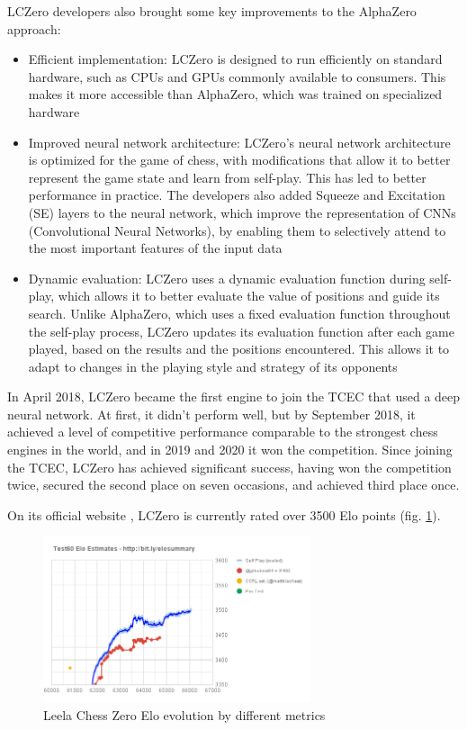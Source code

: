 LCZero developers also brought some key improvements to the AlphaZero approach:
\begin{itemize}
    \item Efficient implementation: LCZero is designed to run efficiently on standard hardware, such as CPUs and GPUs commonly available to consumers. This makes it more accessible than AlphaZero, which was trained on specialized hardware
    \item Improved neural network architecture: LCZero's neural network architecture is optimized for the game of chess, with modifications that allow it to better represent the game state and learn from self-play. This has led to better performance in practice. The developers also added Squeeze and Excitation (SE) layers to the neural network, which improve the representation of CNNs (Convolutional Neural Networks), by enabling them to selectively attend to the most important features of the input data
    \item Dynamic evaluation: LCZero uses a dynamic evaluation function during self-play, which allows it to better evaluate the value of positions and guide its search. Unlike AlphaZero, which uses a fixed evaluation function throughout the self-play process, LCZero updates its evaluation function after each game played, based on the results and the positions encountered. This allows it to adapt to changes in the playing style and strategy of its opponents
\end{itemize}

In April 2018, LCZero became the first engine to join the TCEC that used a deep neural network. At first, it didn't perform well, but by September 2018, it achieved a level of competitive performance comparable to the strongest chess engines in the world, and in 2019 and 2020 it won the competition. Since joining the TCEC, LCZero has achieved significant success, having won the competition twice, secured the second place on seven occasions, and achieved third place once.

On its official website \cite{lczero-training}, LCZero is currently rated over 3500 Elo points (fig. \ref{fig:leelaChessZeroEloEvolution}).

\begin{figure}[h]
    \centering
    \includegraphics[width=0.7\textwidth]{figures/leela-chess-zero-elo-evolution.png}
    \caption{Leela Chess Zero Elo evolution by different metrics \cite{lczero-training}}
    \label{fig:leelaChessZeroEloEvolution}
\end{figure}